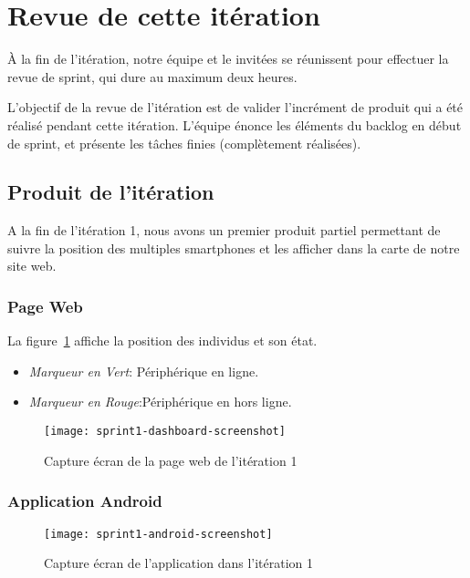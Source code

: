 \section{Revue de cette itération}

À la fin de l'itération, notre équipe et le  invitées
se réunissent pour effectuer la revue de sprint, qui dure au maximum deux
heures.

L'objectif de la revue de l'itération est de valider l'incrément de produit qui
a été réalisé pendant cette itération. L'équipe énonce les éléments du backlog
en début de sprint, et présente les tâches finies (complètement réalisées).

\subsection{Produit de l'itération}

A la fin de l'itération 1, nous avons un premier produit partiel permettant de
suivre la position des multiples smartphones et les afficher dans la carte de
notre site web.

\subsubsection{Page Web }

La figure~\ref{fig:sprint1-dashboard-screenshot} affiche la position des
individus et son état.

\begin{itemize}
    \item \textit{Marqueur en Vert}: Périphérique en ligne.
    \item \textit{Marqueur en Rouge}:Périphérique en hors ligne.
\end{itemize}

\begin{figure}[H]
    \centering
    \texttt{[image: sprint1-dashboard-screenshot]}
    \caption{Capture écran de la page web de l'itération 1}
\label{fig:sprint1-dashboard-screenshot}
\end{figure}

\subsubsection{Application Android}

\begin{figure}[H]
    \centering
    \texttt{[image: sprint1-android-screenshot]}
    \caption{Capture écran de l'application dans l'itération 1}
\label{fig:sprint1-android-screenshot}
\end{figure}

